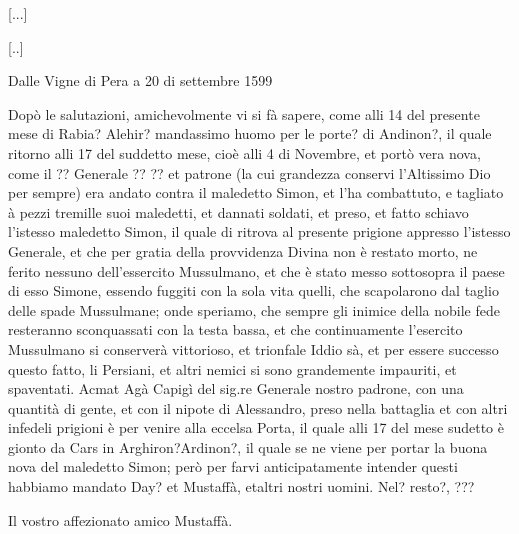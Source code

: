 [...]

\stopcifrato

[..]

Dalle Vigne di Pera a 20 di settembre 1599




Dopò le salutazioni, amichevolmente vi  si fà sapere, come alli 14 del
presente mese  di Rabia?  Alehir?  mandassimo huomo  per le  porte? di
Andinon?, il quale  ritorno alli 17 del suddetto mese,  cioè alli 4 di
Novembre, et portò vera nova, come il ?? Generale ?? ?? et patrone (la
cui grandezza  conservi l'Altissimo Dio per sempre)  era andato contra
il maledetto  Simon, et l'ha  combattuto, e tagliato à  pezzi tremille
suoi  maledetti,  et  dannati  soldati,  et preso,  et  fatto  schiavo
l'istesso maledetto  Simon, il quale  di ritrova al  presente prigione
appresso  l'istesso  Generale, et  che  per  gratia della  provvidenza
Divina  non   è  restato  morto,  ne   ferito  nessuno  dell'essercito
Mussulmano, et che  è stato messo sottosopra il  paese di esso Simone,
essendo fuggiti  con la sola  vita quelli, che scapolarono  dal taglio
delle spade  Mussulmane; onde speriamo,  che sempre gli  inimice della
nobile  fede  resteranno  sconquassati  con  la testa  bassa,  et  che
continuamente  l'esercito  Mussulmano  si  conserverà  vittorioso,  et
trionfale Iddio sà, et per  essere successo questo fatto, li Persiani,
et altri  nemici si sono  grandemente impauriti, et  spaventati. Acmat
Agà Capigì  del sig.re  Generale nostro padrone,  con una  quantità di
gente, et  con il nipote di  Alessandro, preso nella  battaglia et con
altri infedeli prigioni è per venire alla eccelsa Porta, il quale alli
17 del mese sudetto è gionto da Cars in Arghiron?Ardinon?, il quale se
ne viene per portar la buona  nova del maledetto Simon; però per farvi
anticipatamente  intender questi  habbiamo mandato  Day?  et Mustaffà,
etaltri nostri uomini. Nel? resto?, ???

Il vostro affezionato amico Mustaffà.


\setcounter{docnumber}{19}



